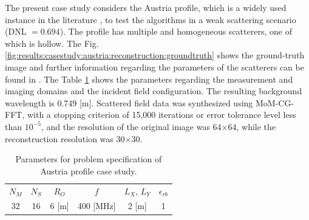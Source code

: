 			The present case study considers the Austria profile, which is a widely used instance in the literature \citep{chen2010subspace,chen2017}, to test the algorithms in a weak scattering scenario (DNL $= 0.694$). The profile has multiple and homogeneous scatterers, one of which is hollow. The Fig. \ref{fig:results:casestudy:austria:reconstruction:groundtruth} shows the ground-truth image and further information regarding the parameters of the scatterers can be found in \citep{chen2010subspace}. The Table \ref{tab:results:casestudy:austria:configuration} shows the parameters regarding the measurement and imaging domains and the incident field configuration. The resulting background wavelength is 0.749 [m]. Scattered field data was synthesized using MoM-CG-FFT, with a stopping criterion of 15,000 iterations or error tolerance level less than $10^{-5}$, and the resolution of the original image was 64$\times$64, while the reconstruction resolution was 30$\times$30.
		
			\begin{table}[!h]
				\centering
				\caption[Parameters for Austria profile case study.]{Parameters for problem specification of Austria profile case study.}
				\begin{tabular}{cccccc}
					$N_M$ & $N_S$ & $R_O$ & $f$ & $L_X$, $L_Y$ & $\epsilon_{rb}$ \\
					32 & 16 & 6 [m] & 400 [MHz] & 2 [m] & 1
				\end{tabular}
				\label{tab:results:casestudy:austria:configuration}
			\end{table}

